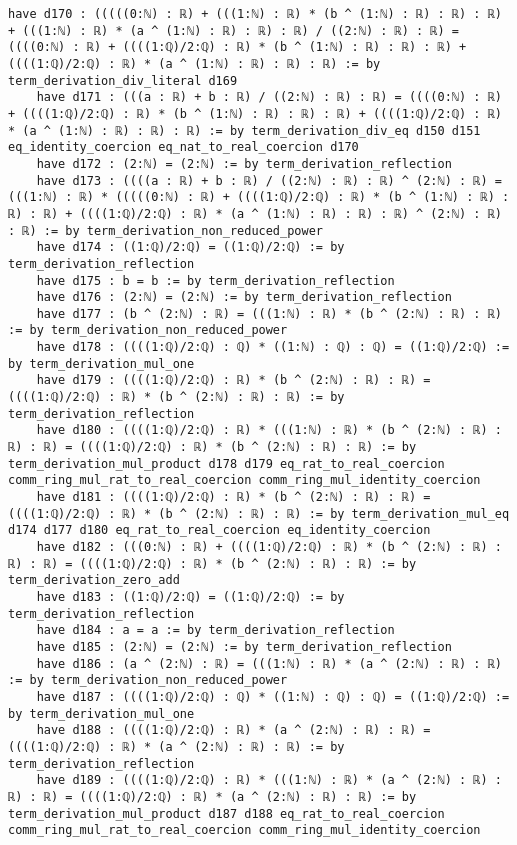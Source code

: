 \documentclass{article}
\begin{document}
\begin{tcolorbox}[colback=white!10, width=\linewidth]
\begin{lstlisting}[language=Lean4]
    have d170 : (((((0:ℕ) : ℝ) + (((1:ℕ) : ℝ) * (b ^ (1:ℕ) : ℝ) : ℝ) : ℝ) + (((1:ℕ) : ℝ) * (a ^ (1:ℕ) : ℝ) : ℝ) : ℝ) / ((2:ℕ) : ℝ) : ℝ) = ((((0:ℕ) : ℝ) + ((((1:ℚ)/2:ℚ) : ℝ) * (b ^ (1:ℕ) : ℝ) : ℝ) : ℝ) + ((((1:ℚ)/2:ℚ) : ℝ) * (a ^ (1:ℕ) : ℝ) : ℝ) : ℝ) := by term_derivation_div_literal d169
    have d171 : (((a : ℝ) + b : ℝ) / ((2:ℕ) : ℝ) : ℝ) = ((((0:ℕ) : ℝ) + ((((1:ℚ)/2:ℚ) : ℝ) * (b ^ (1:ℕ) : ℝ) : ℝ) : ℝ) + ((((1:ℚ)/2:ℚ) : ℝ) * (a ^ (1:ℕ) : ℝ) : ℝ) : ℝ) := by term_derivation_div_eq d150 d151 eq_identity_coercion eq_nat_to_real_coercion d170
    have d172 : (2:ℕ) = (2:ℕ) := by term_derivation_reflection
    have d173 : ((((a : ℝ) + b : ℝ) / ((2:ℕ) : ℝ) : ℝ) ^ (2:ℕ) : ℝ) = (((1:ℕ) : ℝ) * (((((0:ℕ) : ℝ) + ((((1:ℚ)/2:ℚ) : ℝ) * (b ^ (1:ℕ) : ℝ) : ℝ) : ℝ) + ((((1:ℚ)/2:ℚ) : ℝ) * (a ^ (1:ℕ) : ℝ) : ℝ) : ℝ) ^ (2:ℕ) : ℝ) : ℝ) := by term_derivation_non_reduced_power
    have d174 : ((1:ℚ)/2:ℚ) = ((1:ℚ)/2:ℚ) := by term_derivation_reflection
    have d175 : b = b := by term_derivation_reflection
    have d176 : (2:ℕ) = (2:ℕ) := by term_derivation_reflection
    have d177 : (b ^ (2:ℕ) : ℝ) = (((1:ℕ) : ℝ) * (b ^ (2:ℕ) : ℝ) : ℝ) := by term_derivation_non_reduced_power
    have d178 : ((((1:ℚ)/2:ℚ) : ℚ) * ((1:ℕ) : ℚ) : ℚ) = ((1:ℚ)/2:ℚ) := by term_derivation_mul_one
    have d179 : ((((1:ℚ)/2:ℚ) : ℝ) * (b ^ (2:ℕ) : ℝ) : ℝ) = ((((1:ℚ)/2:ℚ) : ℝ) * (b ^ (2:ℕ) : ℝ) : ℝ) := by term_derivation_reflection
    have d180 : ((((1:ℚ)/2:ℚ) : ℝ) * (((1:ℕ) : ℝ) * (b ^ (2:ℕ) : ℝ) : ℝ) : ℝ) = ((((1:ℚ)/2:ℚ) : ℝ) * (b ^ (2:ℕ) : ℝ) : ℝ) := by term_derivation_mul_product d178 d179 eq_rat_to_real_coercion comm_ring_mul_rat_to_real_coercion comm_ring_mul_identity_coercion
    have d181 : ((((1:ℚ)/2:ℚ) : ℝ) * (b ^ (2:ℕ) : ℝ) : ℝ) = ((((1:ℚ)/2:ℚ) : ℝ) * (b ^ (2:ℕ) : ℝ) : ℝ) := by term_derivation_mul_eq d174 d177 d180 eq_rat_to_real_coercion eq_identity_coercion
    have d182 : (((0:ℕ) : ℝ) + ((((1:ℚ)/2:ℚ) : ℝ) * (b ^ (2:ℕ) : ℝ) : ℝ) : ℝ) = ((((1:ℚ)/2:ℚ) : ℝ) * (b ^ (2:ℕ) : ℝ) : ℝ) := by term_derivation_zero_add
    have d183 : ((1:ℚ)/2:ℚ) = ((1:ℚ)/2:ℚ) := by term_derivation_reflection
    have d184 : a = a := by term_derivation_reflection
    have d185 : (2:ℕ) = (2:ℕ) := by term_derivation_reflection
    have d186 : (a ^ (2:ℕ) : ℝ) = (((1:ℕ) : ℝ) * (a ^ (2:ℕ) : ℝ) : ℝ) := by term_derivation_non_reduced_power
    have d187 : ((((1:ℚ)/2:ℚ) : ℚ) * ((1:ℕ) : ℚ) : ℚ) = ((1:ℚ)/2:ℚ) := by term_derivation_mul_one
    have d188 : ((((1:ℚ)/2:ℚ) : ℝ) * (a ^ (2:ℕ) : ℝ) : ℝ) = ((((1:ℚ)/2:ℚ) : ℝ) * (a ^ (2:ℕ) : ℝ) : ℝ) := by term_derivation_reflection
    have d189 : ((((1:ℚ)/2:ℚ) : ℝ) * (((1:ℕ) : ℝ) * (a ^ (2:ℕ) : ℝ) : ℝ) : ℝ) = ((((1:ℚ)/2:ℚ) : ℝ) * (a ^ (2:ℕ) : ℝ) : ℝ) := by term_derivation_mul_product d187 d188 eq_rat_to_real_coercion comm_ring_mul_rat_to_real_coercion comm_ring_mul_identity_coercion

\end{lstlisting}
\end{tcolorbox}
\end{document}
